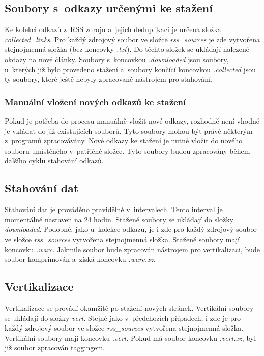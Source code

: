 \subsection{Soubory s~odkazy určenými ke stažení}
Ke kolekci odkazů z~RSS zdrojů a~jejich deduplikaci je určena složka \textit{collected\_links}.
Pro každý zdrojový soubor ve složce \textit{rss\_sources} je zde vytvořena stejnojmenná složka (bez koncovky \textit{.txt}).
Do těchto složek se ukládají nalezené okdazy na nové články. Soubory s~koncovkou \textit{.downloaded}
jsou soubory, u~kterých již bylo provedeno stažení a~soubory končící koncovkou \textit{.collected}
jsou ty soubory, které ještě nebyly zpracované nástrojem pro stahování.

\subsubsection{Manuální vložení nových odkazů ke stažení}
Pokud je potřeba do procesu manuálně vložit nové odkazy, rozhodně není vhodné
je vkládat do již existujících souborů. Tyto soubory mohou být právě některým z~programů
zpracovávány. Nové odkazy ke stažení je nutné vložit do nového souboru
umístěného v~patřičné složce. Tyto soubory budou zpracovány během dalšího cyklu stahování
odkazů.

\subsection{Stahování dat}
Stahování dat je prováděno pravidělně v~intervalech. Tento interval je momentálně
nastaven na 24 hodin. Stažené soubory se ukládají do složky \textit{downloaded}.
Podobně, jako u~kolekce odkazů, je i zde pro každý zdrojový soubor ve složce \textit{rss\_sources}
vytvořena stejnojmenná složka. Stažené soubory mají koncovku \textit{.warc}. Jakmile
soubor bude zpracován nástrojem pro vertikalizaci, bude soubor komprimován a~získá
koncovku \textit{.warc.xz}.

\subsection{Vertikalizace}
Vertikalizace se provádí okamžitě po stažení nových stránek. Vertikální soubory se ukládají
do složky \textit{vert}. Stejně jako v~předchozích případech, i zde je
pro každý zdrojový soubor ve složce \textit{rss\_sources} vytvořena stejnojmenná složka.
Vertikální soubory mají koncovku \textit{.vert}. Pokud má soubor koncovku \textit{.vert.xz},
byl již soubor zpracován taggingem.

